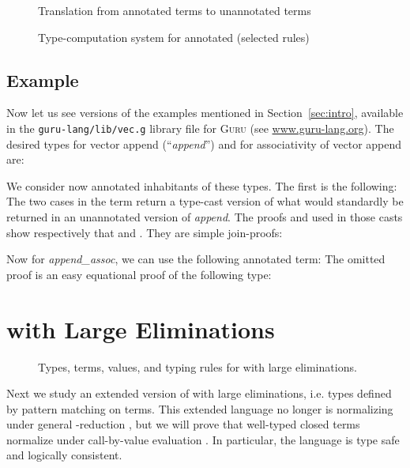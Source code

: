 \documentclass[copyright]{eptcs}
\begin{document}
\begin{figure}

\caption{Translation from annotated terms to unannotated terms}
\label{fig:drop}
\end{figure}

\begin{figure}

\caption{Type-computation system for annotated  (selected rules)}
\label{fig:tpcomp}
\end{figure}

\subsection{Example}
\label{sec:eg}

Now let us see versions of the examples mentioned in
Section~\ref{sec:intro}, available in the \texttt{guru-lang/lib/vec.g}
library file for \textsc{Guru} (see \url{www.guru-lang.org}).  The
desired types for vector append (``\textit{append}'') and for
associativity of vector append are:

\noindent We consider now annotated inhabitants of these types.  The
first is the following:
{\small
}
\noindent The two cases in the  term return a type-cast version
of what would standardly be returned in an unannotated version of
\textit{append}.  The proofs  and  used in those casts show
respectively that  and
. They
are simple join-proofs:

\noindent Now for \textit{append\_assoc}, we can use the following annotated term:
{\small
}
\noindent The omitted proof  is an easy equational proof of the following type:


\section{ with Large Eliminations}
\label{sec:tveclarge}

\begin{figure}


\caption{Types, terms, values, and typing rules for  with large eliminations.}
\label{fig:tveclarge}
\end{figure}

Next we study an extended version of  with large eliminations,
i.e. types defined by pattern matching on terms.  This extended
language no longer is normalizing under general -reduction
, but we will prove that well-typed closed terms normalize
under call-by-value evaluation . In particular, the language is
type safe and logically consistent.
\end{document}
